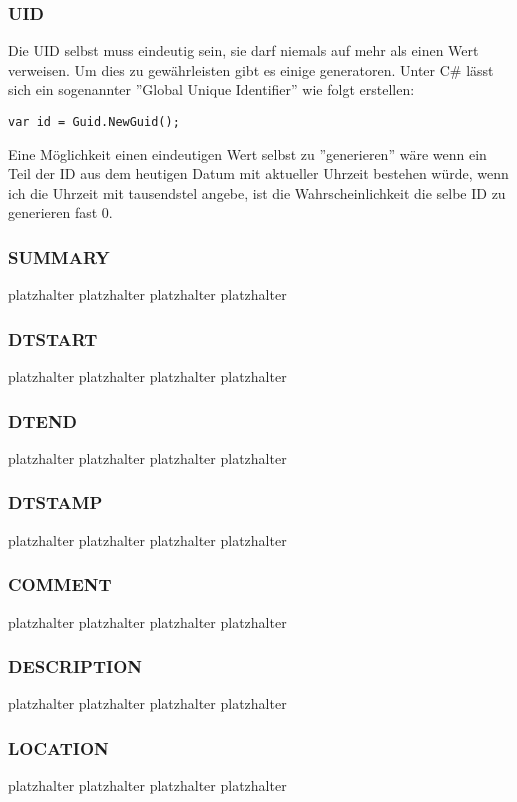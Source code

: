 \subsubsection{UID}
\label{sec:uid}
Die UID selbst muss eindeutig sein, sie darf niemals auf mehr als einen Wert verweisen. Um dies zu gewährleisten gibt es einige generatoren. Unter C\# lässt sich ein sogenannter ''Global Unique Identifier'' wie folgt erstellen: \\
\begin{lstlisting}[caption=GUID in C\#, label=lst:test]
var id = Guid.NewGuid(); 
\end{lstlisting}
Eine Möglichkeit einen eindeutigen Wert selbst zu ''generieren'' wäre wenn ein Teil der ID aus dem heutigen Datum mit aktueller Uhrzeit bestehen würde, wenn ich die Uhrzeit mit tausendstel angebe, ist die Wahrscheinlichkeit die selbe ID zu generieren fast 0. 
\subsubsection{SUMMARY}
\label{sec:summary}
platzhalter platzhalter platzhalter platzhalter 
\subsubsection{DTSTART}
\label{sec:dtstart}
platzhalter platzhalter platzhalter platzhalter 
\subsubsection{DTEND}
\label{sec:dtend}
platzhalter platzhalter platzhalter platzhalter 
\subsubsection{DTSTAMP}
\label{sec:dtstamp}
platzhalter platzhalter platzhalter platzhalter 
\subsubsection{COMMENT}
\label{sec:comment}
platzhalter platzhalter platzhalter platzhalter 
\subsubsection{DESCRIPTION}
\label{sec:description}
platzhalter platzhalter platzhalter platzhalter 
\subsubsection{LOCATION}
\label{sec:location}
platzhalter platzhalter platzhalter platzhalter 
